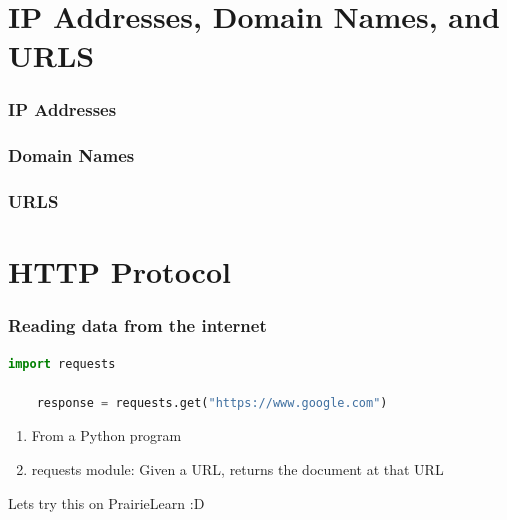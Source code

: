\documentclass{beamer}
\begin{document}
\section{IP Addresses, Domain Names, and URLS}

%
%
\begin{frame}[fragile]
    \frametitle{IP Addresses}
    \begin{figure}
    \end{figure}
\end{frame}

%
%
\begin{frame}[fragile]
    \frametitle{Domain Names}
\end{frame}

%
%
\begin{frame}[fragile]
    \frametitle{URLS}
\end{frame}



\section{HTTP Protocol}
%
%
\begin{frame}[fragile]
    \frametitle{Reading data from the internet}
    \begin{lstlisting}[language=Python, autogoggle]
    import requests

    response = requests.get("https://www.google.com")
    \end{lstlisting} 
    \vfill
    \begin{enumerate}[A]
        \item From a Python program
        \item requests module: Given a URL, returns the document at that URL
    \end{enumerate}
    \pause
    Lets try this on PrairieLearn :D 
\end{frame}
\end{document}
